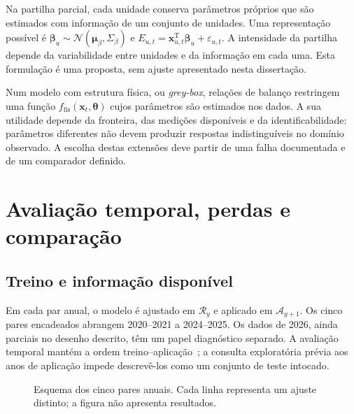 Na partilha parcial, cada unidade conserva parâmetros próprios que são estimados com informação de um conjunto de unidades. Uma representação possível é $\boldsymbol\beta_u\sim\mathcal N(\boldsymbol\mu_\beta,\Sigma_\beta)$ e $E_{u,t}=\boldsymbol x_{u,t}^{\mathrm T}\boldsymbol\beta_u+\varepsilon_{u,t}$. A intensidade da partilha depende da variabilidade entre unidades e da informação em cada uma. Esta formulação é uma proposta, sem ajuste apresentado nesta dissertação.

Num modelo com estrutura física, ou \emph{grey-box}, relações de balanço restringem uma função $f_{\mathrm{fis}}(\boldsymbol x_t,\boldsymbol\theta)$ cujos parâmetros são estimados nos dados. A sua utilidade depende da fronteira, das medições disponíveis e da identificabilidade: parâmetros diferentes não devem produzir respostas indistinguíveis no domínio observado. A escolha destas extensões deve partir de uma falha documentada e de um comparador definido.

\section{Avaliação temporal, perdas e comparação}
\label{sec:mat-avaliacao-temporal}

\subsection{Treino e informação disponível}
\label{sec:mat-tempo}
Em cada par anual, o modelo é ajustado em $\mathcal R_y$ e aplicado em $\mathcal A_{y+1}$. Os cinco pares encadeados abrangem 2020--2021 a 2024--2025. Os dados de 2026, ainda parciais no desenho descrito, têm um papel diagnóstico separado. A avaliação temporal mantém a ordem treino--aplicação~\parencite{Tashman2000}; a consulta exploratória prévia aos anos de aplicação impede descrevê-los como um conjunto de teste intocado.

\begin{figure}[htbp]
\centering
{}
\caption{Esquema dos cinco pares anuais. Cada linha representa um ajuste distinto; a figura não apresenta resultados.}
\label{fig:mat-pares}
\end{figure}

